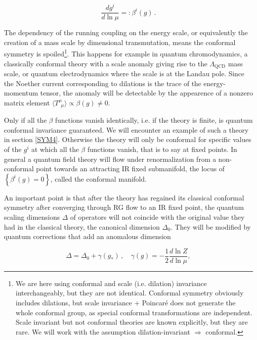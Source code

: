 \begin{equation}
	\frac{dg^i}{d\ln\mu} =: \beta^i(g)\,.
	\label{}
\end{equation}

The dependency of the running coupling on the energy scale, or equivalently the creation of a mass scale by dimensional transmutation, means the conformal symmetry is spoiled\footnote{We are here using conformal and scale (i.e. dilation) invariance interchangeably, but they are not identical. Conformal symmetry obviously includes dilations, but scale invariance $+$ Poincar\'e does not generate the whole conformal group, as special conformal transformations are independent. Scale invariant but not conformal theories are known explicitly\cite{scalebutnotconf}, but they are rare. We will work with the assumption dilation-invariant $\Rightarrow$ conformal.}. This happens for example in quantum chromodynamics, a classically conformal theory with a scale anomaly giving rise to the $\Lambda_\text{QCD}$ mass scale, or quantum electrodynamics where the scale is at the Landau pole. Since the Noether current corresponding to dilations is the trace of the energy-momentum tensor, the anomaly will be detectable by the appearence of a nonzero matrix element $\langle T^{\mu}_{\;\,\mu} \rangle \propto \beta(g) \neq 0$.

Only if all the $\beta$ functions vanish identically, i.e. if the theory is finite, is quantum conformal invariance guaranteed. We will encounter an example of such a theory in section \ref{SYM4}. Otherwise the theory will only be conformal for specific values of the $g^i$ at which all the $\beta$ functions vanish, that is to say at fixed points. In general a quantum field theory will flow under renormalization from a non-conformal point towards an attracting IR fixed submanifold, the locus of $\left\{ \beta^i(g) = 0 \right\}$, called the conformal manifold.

An important point is that after the theory has regained its classical conformal symmetry after converging through RG flow to an IR fixed point, the quantum scaling dimensions $\Delta$ of operators will not coincide with the original value they had in the classical theory, the canonical dimension $\Delta_0$. They will be modified by quantum corrections that add an anomalous dimension

\begin{equation}
	\Delta = \Delta_0 + \gamma(g_*)\,,\quad \gamma(g) = - \frac{1}{2}\frac{d \ln Z}{d \ln\mu},
	\label{}
\end{equation}

